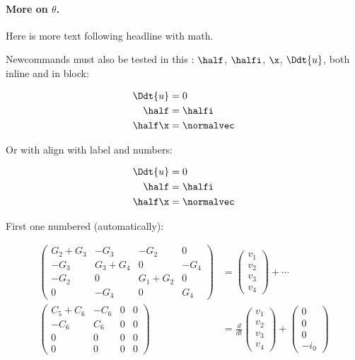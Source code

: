 \documentclass[%
oneside,                 %
final,                   %
10pt]{article}
\theoremstyle{definition}
\begin{document}
\begin{enumerate}
\paragraph{More on $\theta$.}
Here is more text following headline with math.

Newcommands must also be tested in this \report:
$\half$, $\halfi$, $\x$, $\Ddt{u}$,
both inline and in block:

\begin{align}
\Ddt{u} &= 0\nonumber
\\ 
\half &= \halfi\\ 
\half\x &= \normalvec
\end{align}

Or with align with label and numbers:

\begin{align}
\Ddt{u} &= 0
\label{aligneq1}
\\ 
\half &= \halfi\\ 
\half\x &= \normalvec
\label{aligneq2}
\end{align}


First one numbered (automatically):

\begin{align}
\begin{pmatrix}
G_2 + G_3 & -G_3 & -G_2 & 0 \\ 
-G_3 & G_3 + G_4 & 0 & -G_4 \\ 
-G_2 & 0 & G_1 + G_2 & 0 \\ 
0 & -G_4 & 0 & G_4
\end{pmatrix}
&=
\begin{pmatrix}
 v_1 \\ 
 v_2 \\ 
 v_3 \\ 
 v_4
\end{pmatrix}
+ \cdots \\ 
\begin{pmatrix}
 C_5 + C_6 & -C_6 & 0 & 0 \\ 
 -C_6 & C_6 & 0 & 0 \\ 
 0 & 0 & 0 & 0 \\ 
 0 & 0 & 0 & 0
\end{pmatrix}
  &= \frac{d}{dt}\begin{pmatrix}
 v_1 \\ 
 v_2 \\ 
 v_3 \\ 
 v_4
\end{pmatrix} +
\begin{pmatrix}
 0 \\ 
 0 \\ 
 0 \\ 
 -i_0
\end{pmatrix}
\nonumber
\end{align}


\end{enumerate}
\end{document}
